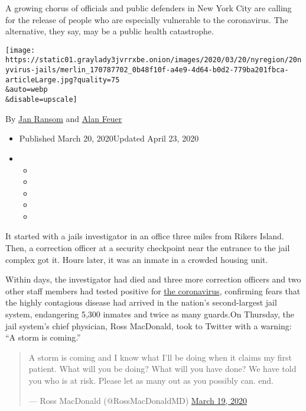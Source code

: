 A growing chorus of officials and public defenders in New York City are
calling for the release of people who are especially vulnerable to the
coronavirus. The alternative, they say, may be a public health
catastrophe.

\texttt{[image: https://static01.graylady3jvrrxbe.onion/images/2020/03/20/nyregion/20nyvirus-jails/merlin\_170787702\_0b48f10f-a4e9-4d64-b0d2-779ba201fbca-articleLarge.jpg?quality=75\\\&auto=webp\\\&disable=upscale]}

By \href{https://www.nytimes3xbfgragh.onion/by/jan-ransom}{Jan Ransom}
and \href{https://www.nytimes3xbfgragh.onion/by/alan-feuer}{Alan Feuer}

\begin{itemize}
\item
  Published March 20, 2020Updated April 23, 2020
\item
  \begin{itemize}
  \item
  \item
  \item
  \item
  \item
  \end{itemize}
\end{itemize}

It started with a jails investigator in an office three miles from
Rikers Island. Then, a correction officer at a security checkpoint near
the entrance to the jail complex got it. Hours later, it was an inmate
in a crowded housing unit.

Within days, the investigator had died and three more correction
officers and two other staff members had tested positive for
\href{https://www.nytimes3xbfgragh.onion/2020/04/23/podcasts/the-daily/jails-inmates-coronavirus.html}{the
coronavirus}, confirming fears that the highly contagious disease had
arrived in the nation's second-largest jail system, endangering 5,300
inmates and twice as many guards.On Thursday, the jail system's chief
physician, Ross MacDonald, took to Twitter with a warning: ``A storm is
coming.''

\begin{quote}
A storm is coming and I know what I'll be doing when it claims my first
patient. What will you be doing? What will you have done? We have told
you who is at risk. Please let as many out as you possibly can. end.

--- Ross MacDonald (@RossMacDonaldMD)
\href{https://twitter.com/RossMacDonaldMD/status/1240455802193883137?ref_src=twsrc\%5Etfw}{March
19, 2020}
\end{quote}

